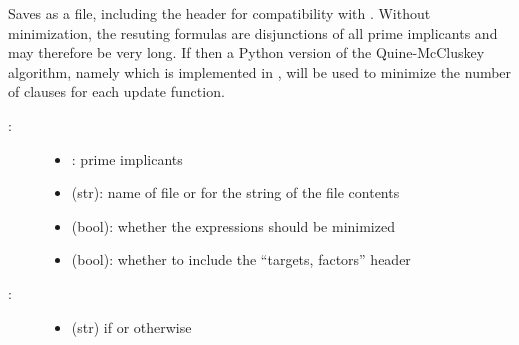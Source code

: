 \documentclass[letterpaper,10pt,english]{sphinxmanual}
\begin{document}
\begin{fulllineitems}
\label{\detokenize{FileExchange:PyBoolNet.FileExchange.primes2bnet}}
Saves  as a  file, including the header  for compatibility with {\hyperref[\detokenize{Installation:installation-boolnet}]{}}.
Without minimization, the resuting formulas are disjunctions of all prime implicants and may therefore be very long.
If  then a Python version of the Quine-McCluskey algorithm,
namely {\hyperref[\detokenize{Bibliography:prekas2012}]{}} which is implemented in {\hyperref[\detokenize{QuineMcCluskey:primes2mindnf}]{}},
will be used to minimize the number of clauses for each update function.
\begin{description}
\item[{:}] \leavevmode\begin{itemize}
\item {} 
: prime implicants

\item {} 
 (str): name of  file or  for the string of the file contents

\item {} 
 (bool): whether the expressions should be minimized

\item {} 
 (bool): whether to include the “targets, factors” header

\end{itemize}

\item[{:}] \leavevmode\begin{itemize}
\item {} 
 (str) if  or  otherwise

\end{itemize}

\end{description}


\end{fulllineitems}
\end{document}
